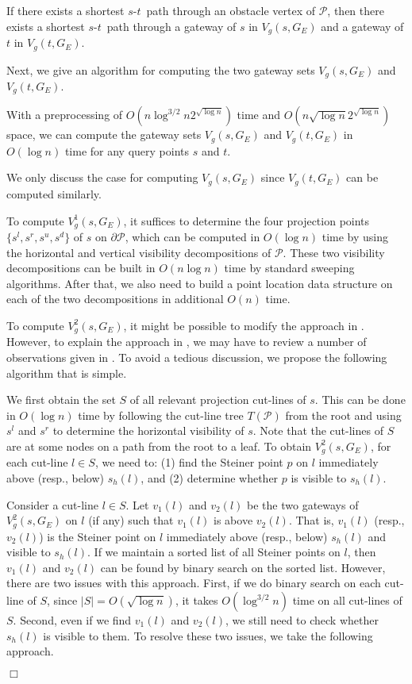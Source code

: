 \documentclass[english,runningheads,11pt]{llncs}
\def\calP{\mathcal{P}}
\def\st{$s$-$t$}
\newenvironment{proof}{\noindent {\textbf{Proof:}}\rm}{\hfill $\Box$\rm}
\begin{document}
\begin{corollary}\label{cor:10}
If there exists a shortest \st\ path through an obstacle vertex of
$\calP$, then there exists a shortest \st\ path through a gateway of
$s$ in $V_g(s,G_E)$ and a gateway of $t$ in $V_g(t,G_E)$.
\end{corollary}

Next, we give an algorithm for computing the two gateway sets $V_g(s,G_E)$ and
$V_g(t,G_E)$.


\begin{lemma}\label{lem:30}
With a preprocessing of $O(n\log^{3/2} n2^{\sqrt{\log n}})$ time
and $O(n\sqrt{\log n}2^{\sqrt{\log n}})$ space,
we can compute the gateway sets $V_g(s,G_E)$ and
$V_g(t,G_E)$  in $O(\log n)$ time for any query points $s$ and $t$.
\end{lemma}
\begin{proof}
We only discuss the case for computing $V_g(s,G_E)$ since $V_g(t,G_E)$ can be
computed similarly.

To compute $V^1_g(s,G_E)$, it suffices to determine the four
projection points $\{s^l,s^r,s^u,s^d\}$ of $s$ on $\partial\calP$, which can be computed in
$O(\log n)$ time by using the horizontal and vertical
visibility decompositions of $\calP$. These two visibility decompositions can be built in
$O(n\log n)$ time by standard sweeping algorithms.
After that, we also need to build a point location
data structure \cite{ref:EdelsbrunnerOp86,ref:KirkpatrickOp83} on each of the
two decompositions in additional $O(n)$ time.

To compute $V^2_g(s,G_E)$, it might be possible to modify the approach in
\cite{ref:ChenSh00}. However, to explain the approach in
\cite{ref:ChenSh00}, we may have to review a number of observations given
in \cite{ref:ChenSh00}. To avoid a tedious discussion, we propose
the following algorithm that is simple.


We first obtain the set $S$ of all relevant projection cut-lines of $s$. This can be
done in $O(\log n)$ time by following the cut-line tree $T(\calP)$
from the root and using $s^l$ and $s^r$ to determine the horizontal visibility of $s$.
Note that the cut-lines of $S$ are at some
nodes on a path from the root to a leaf. To obtain
$V^2_g(s,G_E)$, for each cut-line $l\in S$, we need to: (1) find the
Steiner point $p$ on $l$ immediately above (resp., below) $s_h(l)$, and (2)
determine whether $p$ is visible to $s_h(l)$.

Consider a cut-line $l\in S$. Let $v_1(l)$ and $v_2(l)$ be the two
gateways of $V^2_g(s,G_E)$ on $l$ (if any) such that $v_1(l)$ is above
$v_2(l)$. That is, $v_1(l)$ (resp., $v_2(l)$) is the Steiner
point on $l$ immediately above (resp., below) $s_h(l)$ and visible to $s_h(l)$.
If we maintain a sorted list of all Steiner
points on $l$, then $v_1(l)$ and $v_2(l)$ can be found by binary
search  on the sorted list. However, there are two issues with this
approach. First, if we do binary search on each cut-line of $S$, since
$|S|=O(\sqrt{\log n})$, it takes $O(\log^{3/2}n)$ time
on all cut-lines of $S$. Second, even if we find $v_1(l)$ and
$v_2(l)$, we still need to check whether $s_h(l)$ is visible to them. To
resolve these two issues, we take the following approach.




\end{proof}
\end{document}

